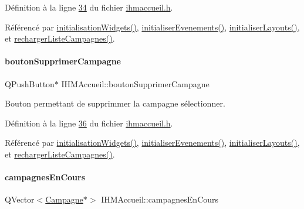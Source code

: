 Définition à la ligne \hyperlink{ihmaccueil_8h_source_l00034}{34} du fichier \hyperlink{ihmaccueil_8h_source}{ihmaccueil.\+h}.



Référencé par \hyperlink{ihmaccueil_8cpp_source_l00037}{initialisation\+Widgets()}, \hyperlink{ihmaccueil_8cpp_source_l00084}{initialiser\+Evenements()}, \hyperlink{ihmaccueil_8cpp_source_l00049}{initialiser\+Layouts()}, et \hyperlink{ihmaccueil_8cpp_source_l00092}{recharger\+Liste\+Campagnes()}.

\mbox{\label{class_i_h_m_accueil_afb409fb4395372f35f9f8699fcb4c89b}} 
\paragraph{\texorpdfstring{bouton\+Supprimer\+Campagne}{boutonSupprimerCampagne}}
{\footnotesize\ttfamily Q\+Push\+Button$\ast$ I\+H\+M\+Accueil\+::bouton\+Supprimer\+Campagne\hspace{0.3cm}{\ttfamily [private]}}



Bouton permettant de supprimmer la campagne sélectionner. 



Définition à la ligne \hyperlink{ihmaccueil_8h_source_l00036}{36} du fichier \hyperlink{ihmaccueil_8h_source}{ihmaccueil.\+h}.



Référencé par \hyperlink{ihmaccueil_8cpp_source_l00037}{initialisation\+Widgets()}, \hyperlink{ihmaccueil_8cpp_source_l00084}{initialiser\+Evenements()}, \hyperlink{ihmaccueil_8cpp_source_l00049}{initialiser\+Layouts()}, et \hyperlink{ihmaccueil_8cpp_source_l00092}{recharger\+Liste\+Campagnes()}.

\mbox{\label{class_i_h_m_accueil_ad3827b81480eb201b5927c16a2ad1c46}} 
\paragraph{\texorpdfstring{campagnes\+En\+Cours}{campagnesEnCours}}
{\footnotesize\ttfamily Q\+Vector$<$\hyperlink{class_campagne}{Campagne}$\ast$$>$ I\+H\+M\+Accueil\+::campagnes\+En\+Cours\hspace{0.3cm}{\ttfamily [private]}}



